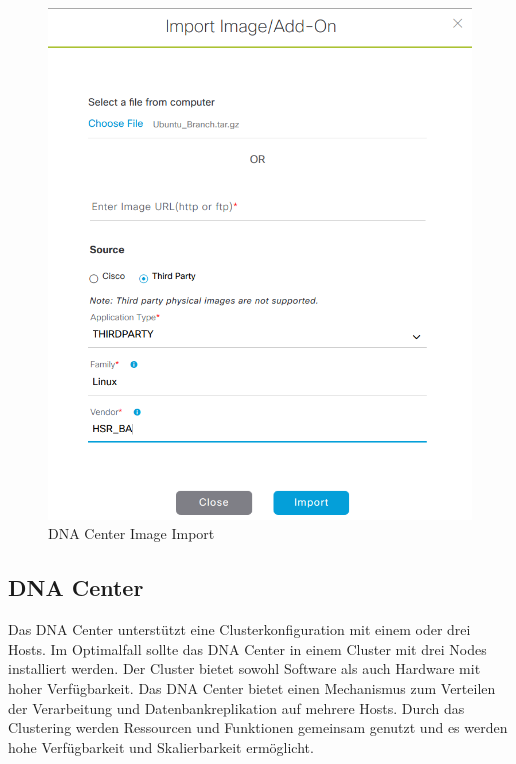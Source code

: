 \begin{figure}[H]
	\centering
	\includegraphics[width=0.8\linewidth]{img/Absicherung/DNA-Center-Image-Import.png}
	\caption{DNA Center Image Import}
	\label{fig:DNA Center Image Import}
\end{figure}





\subsection{DNA Center}
Das DNA Center unterstützt eine Clusterkonfiguration mit einem oder drei Hosts. Im Optimalfall sollte das DNA Center in einem Cluster mit drei Nodes installiert werden. Der Cluster bietet sowohl Software als auch Hardware mit hoher Verfügbarkeit. Das DNA Center bietet einen Mechanismus zum Verteilen der Verarbeitung und Datenbankreplikation auf mehrere Hosts. Durch das Clustering werden Ressourcen und Funktionen gemeinsam genutzt und es werden hohe Verfügbarkeit und Skalierbarkeit ermöglicht. \\

